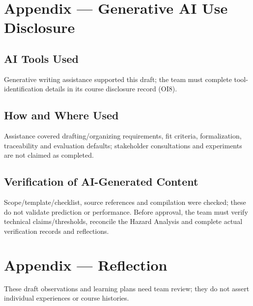 \documentclass[12pt]{article}
\begin{document}
\section{Appendix --- Generative AI Use Disclosure}


\subsection{AI Tools Used}
Generative writing assistance supported this draft; the team must complete
tool-identification details in its course disclosure record (OI8).

\subsection{How and Where Used}
Assistance covered drafting/organizing requirements, fit criteria,
formalization, traceability and evaluation defaults; stakeholder consultations
and experiments are not claimed as completed.

\subsection{Verification of AI-Generated Content}
Scope/template/checklist, source references and compilation were checked;
these do not validate prediction or performance. Before approval, the team
must verify technical claims/thresholds, reconcile the Hazard Analysis and
complete actual verification records and reflections.

\newpage{}

\section{Appendix --- Reflection}


These draft observations and learning plans need team review; they do not
assert individual experiences or course histories.
\end{document}
